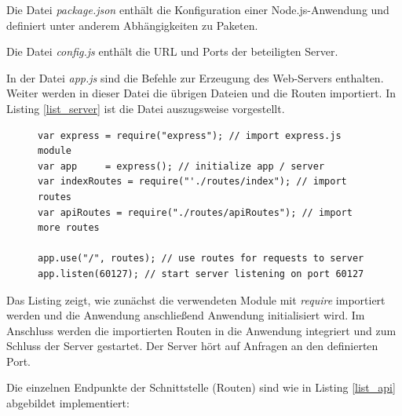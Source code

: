 Die Datei \textit{package.json} enthält die Konfiguration einer Node.js-Anwendung und 
definiert unter anderem Abhängigkeiten zu Paketen.

Die Datei \textit{config.js} enthält die URL und Ports der beteiligten Server.

In der Datei \textit{app.js} sind die Befehle zur Erzeugung des Web-Servers enthalten. Weiter werden in dieser Datei die übrigen Dateien und die Routen importiert. In Listing \ref{list_server} ist die Datei auszugsweise vorgestellt.

\begin{figure}[h]
\begin{lstlisting}[caption={Auszug aus app.js}, label=list_server]
var express	= require("express"); // import express.js module
var app		= express(); // initialize app / server
var indexRoutes = require("'./routes/index"); // import routes
var apiRoutes = require("./routes/apiRoutes"); // import more routes

app.use("/", routes); // use routes for requests to server
app.listen(60127); // start server listening on port 60127
\end{lstlisting}
\end{figure}

Das Listing zeigt, wie zunächst die verwendeten Module mit \textit{require} importiert werden und die Anwendung anschließend Anwendung initialisiert wird. Im Anschluss werden die importierten Routen in die Anwendung integriert und zum Schluss der Server gestartet. Der Server hört auf Anfragen an den definierten Port.

Die einzelnen Endpunkte der Schnittstelle (Routen) sind wie in Listing \ref{list_api} abgebildet implementiert:

